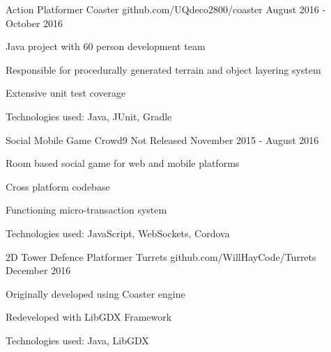\begin{cventries}
\cventry
{Action Platformer} %
{Coaster} %
{github.com/UQdeco2800/coaster} %
{August 2016 - October 2016} %
{ %
\begin{cvitems}
\item Java project with 60 person development team
\item Responsible for procedurally generated terrain and object layering system
\item Extensive unit test coverage
\item Technologies used: Java, JUnit, Gradle
\end{cvitems}
}

\cventry
{Social Mobile Game} %
{Crowd9} %
{Not Released} %
{November 2015 - August 2016} %
{ %
\begin{cvitems}
\item Room based social game for web and mobile platforms
\item Cross platform codebase
\item Functioning micro-transaction system
\item Technologies used: JavaScript, WebSockets, Cordova
\end{cvitems}
}

\cventry
{2D Tower Defence Platformer} %
{Turrets} %
{github.com/WillHayCode/Turrets} %
{December 2016} %
{ %
\begin{cvitems}
\item Originally developed using Coaster engine
\item Redeveloped with LibGDX Framework
\item Technologies used: Java, LibGDX
\end{cvitems}
}

\end{cventries}
